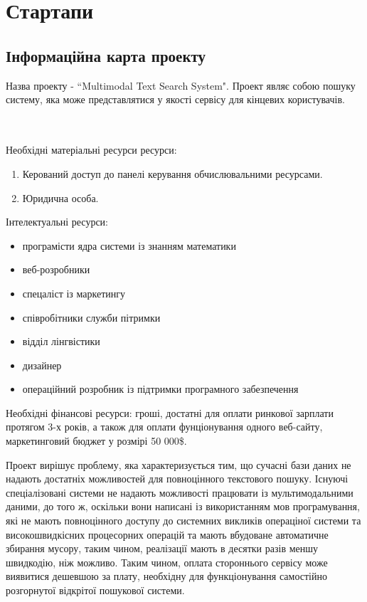 \chapter{Стартапи}
\section{Інформаційна карта проекту}
Назва проекту - ``Multimodal Text Search System". Проект являє собою пошуку систему, яка може представлятися у якості сервісу для кінцевих користувачів.
\begin{tabular}
  {|l|p{8cm}|}
\hline

\end{tabular}
\\
Необхідні матеріальні ресурси ресурси:
\begin{enumerate}
\item Керований доступ до панелі керування обчислювальними ресурсами.
\item Юридична особа.
\end{enumerate}
Інтелектуальні ресурси:
\begin{itemize}
  \item програмісти ядра системи із знанням математики
  \item веб-розробники
  \item спецаліст із маркетингу
  \item співробітники служби пітримки
  \item відділ лінгвістики
  \item дизайнер
  \item операційний розробник із підтримки програмного забезпечення
\end{itemize}
Необхідні фінансові ресурси: гроші, достатні для оплати ринкової зарплати протягом 3-х років, а також для оплати фунціонування одного веб-сайту, маркетинговий бюджет у розмірі 50 000\$.

Проект вирішує проблему, яка характеризується тим, що сучасні бази даних не надають достатніх можливостей для
повноцінного текстового пошуку. Існуючі спеціалізовані системи не надають можливості працювати із мультимодальними даними, до того ж, оскільки вони написані із використанням мов програмування,
які не мають повноцінного доступу до системних викликів операціної системи та високошвидкісних процесорних операцій та мають вбудоване автоматичне збирання мусору, таким чином, реалізації
мають в десятки разів меншу швидкодію, ніж можливо. Таким чином, оплата стороннього сервісу може виявитися дешевшою за плату, необхідну для функціонування самостійно розгорнутої відкрітої
пошукової системи.


